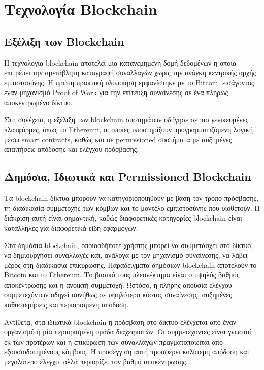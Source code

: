 \documentclass[12pt,a4paper]{report}
\begin{document}
\chapter{Τεχνολογία Blockchain}

\section{Εξέλιξη των Blockchain}

Η τεχνολογία blockchain αποτελεί μια κατανεμημένη δομή δεδομένων η οποία επιτρέπει την αμετάβλητη καταγραφή συναλλαγών χωρίς την ανάγκη κεντρικής αρχής εμπιστοσύνης. Η πρώτη πρακτική υλοποίηση εμφανίστηκε με το Bitcoin, εισάγοντας έναν μηχανισμό Proof of Work για την επίτευξη συναίνεσης σε ένα πλήρως αποκεντρωμένο δίκτυο.

Στη συνέχεια, η εξέλιξη των blockchain συστημάτων οδήγησε σε πιο γενικευμένες πλατφόρμες, όπως το Ethereum, οι οποίες υποστηρίζουν προγραμματιζόμενη λογική μέσω smart contracts, καθώς και σε permissioned συστήματα με αυξημένες απαιτήσεις απόδοσης και ελέγχου πρόσβασης.

\section{Δημόσια, Ιδιωτικά και Permissioned Blockchain}

Τα blockchain δίκτυα μπορούν να κατηγοριοποιηθούν με βάση τον τρόπο πρόσβασης, τη διαδικασία συμμετοχής των κόμβων και το μοντέλο εμπιστοσύνης που υιοθετούν. Η διάκριση αυτή είναι σημαντική, καθώς διαφορετικές κατηγορίες blockchain είναι κατάλληλες για διαφορετικά είδη εφαρμογών.

Στα δημόσια blockchain, οποιοσδήποτε χρήστης μπορεί να συμμετάσχει στο δίκτυο, να δημιουργήσει συναλλαγές και, ανάλογα με τον μηχανισμό συναίνεσης, να λάβει μέρος στη διαδικασία επικύρωσης. Παραδείγματα δημόσιων blockchain αποτελούν το Bitcoin και το Ethereum. Το βασικό τους πλεονέκτημα είναι ο υψηλός βαθμός αποκέντρωσης και η ανοικτή συμμετοχή. Ωστόσο, η πλήρης απουσία ελέγχου συμμετεχόντων οδηγεί συνήθως σε υψηλότερο κόστος συναίνεσης, αυξημένες καθυστερήσεις και περιορισμένη απόδοση.

Αντίθετα, στα ιδιωτικά blockchain η πρόσβαση στο δίκτυο ελέγχεται από έναν οργανισμό ή μία περιορισμένη ομάδα διαχειριστών. Οι συμμετέχοντες είναι γνωστοί εκ των προτέρων και η επικύρωση των συναλλαγών πραγματοποιείται από εξουσιοδοτημένους κόμβους. Η προσέγγιση αυτή προσφέρει καλύτερη απόδοση και μεγαλύτερο έλεγχο, αλλά περιορίζει τον βαθμό αποκέντρωσης.
\end{document}
